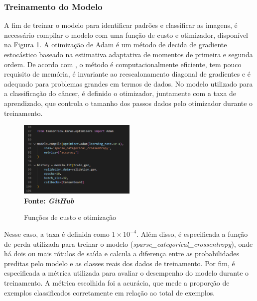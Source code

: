 
\subsubsection{\esp Treinamento do Modelo} \label{treinamento}

A fim de treinar o modelo para identificar padrões e classificar as imagens, é necessário compilar o modelo com uma função de custo e otimizador, disponível na Figura \ref{fig:training}. A otimização de Adam é um método de decida de gradiente estocástico baseado na estimativa adaptativa de momentos de primeira e segunda ordem. De acordo com , o método é computacionalmente eficiente, tem pouco requisito de memória, é invariante ao reescalonamento diagonal de gradientes e é adequado para problemas grandes em termos de dados. No modelo utilizado para a classificação do câncer, é definido o otimizador, juntamente com a taxa de aprendizado, que controla o tamanho dos passos dados pelo otimizador durante o treinamento. 

\begin{figure}[ht]
 	\centering	
 	\caption[\hspace{0.1cm}Grade Computacional.]{Funções de custo e otimização}
 	\vspace{-0.4cm}
 	\includegraphics[width=0.5\textwidth]{figuras/training.png}
 	\captionsetup{justification=centering}
	\vspace{-0.2cm}
     \\\textbf{\footnotesize Fonte: \textit{GitHub}}
	\label{fig:training}
\end{figure}

Nesse caso, a taxa é definida como \ensuremath{1 \times 10^{-4}}. Além disso, é especificada a função de perda utilizada para treinar o modelo (\textit{sparse\_categorical\_crossentropy}), onde há dois ou mais rótulos de saída e calcula a diferença entre as probabilidades preditas pelo modelo e as classes reais dos dados de treinamento. Por fim, é especificada a métrica utilizada para avaliar o desempenho do modelo durante o treinamento. A métrica escolhida foi a acurácia, que mede a proporção de exemplos classificados corretamente em relação ao total de exemplos. 


